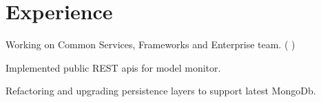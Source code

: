 \documentclass[]{deedy-resume-openfont}
\begin{document}
    
%
%
%
%
\section{Experience}

\hfill {}
\begin{tightemize}
	\item Working on Common Services, Frameworks and Enterprise team.
	(
        {}
    )
	\item Implemented public REST apis for model monitor.
	\item Refactoring and upgrading persistence layers to support latest MongoDb.
\end{tightemize}
\sectionsep
\end{document}
